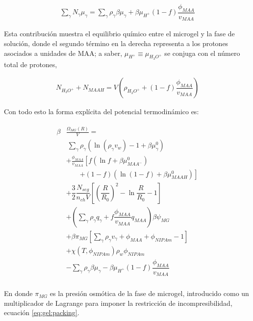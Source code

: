\begin{align}
	\sum_\gamma N_\gamma \mu_\gamma = \sum_{\gamma }{\rho_\gamma\beta\mu_\gamma}
	+ \beta\mu_{H^+}(1-f)\dfrac{\phi_{MAA}}{v_{MAA}}
\end{align}

Esta contribuci\'on muestra el equilibrio qu\'imico entre el microgel y la fase de soluci\'on, donde el segundo t\'ermino en la derecha representa a los protones asociados a unidades de MAA;
a saber, $\mu_{H^+}\equiv\mu_{H_3O^+}$ se conjuga con el n\'umero total de protones,

\begin{align}
	N_{H_3O^+}+N_{MAAH}=V\left(\rho_{H_3O^+}+(1-f)\dfrac{\phi_{MAA}}{v_{MAA}}\right)
	\label{eq:gel:equilibrio}
\end{align}



Con todo esto la forma expl\'icita del potencial termodin\'amico es:




%
\begin{align}
\begin{aligned}
\beta&\frac{\Omega_{MG}(R)}{V}=\\& ~ \sum_{\gamma} \rho_\gamma\left(\ln\left(\rho_\gamma v_w\right) -1 + \beta\mu^0_\gamma\right) \\
& + \frac{\phi_{MAA}}{v_{MAA}} \left[f(\ln f+ \beta\mu^0_{MAA^-})\right.\\
&\qquad\left.+(1-f)(\ln (1-f)+\beta\mu^0_{MAAH})\right] \\
%
& + \dfrac{3}{2}\dfrac{N_{seg}}{n_{ch} V}\left[\left(\dfrac{R}{R_0}\right)^2 - \ln\dfrac{R}{R_0} -1\right] \\
%
& +  \left(\sum_{\gamma } {\rho_\gamma q_\gamma + f\dfrac{\phi_{MAA}}{v_{MAA}}q_{MAA}}\right)\beta\psi_{MG}\\
%
& +\beta\pi_{MG} \left[ \sum_{\gamma } \rho_\gamma v_\gamma  + \phi_{MAA} + \phi_{NIPAm} -1 \right] \\
%
& + \chi (T, \phi_{NIPAm})\rho_w \phi_{NIPAm} \\
%
& -\sum_{\gamma }{\rho_\gamma\beta\mu_\gamma}
 -\beta\mu_{H^+}(1-f)\dfrac{\phi_{MAA}}{v_{MAA}}\\
%
%
\end{aligned}
\label{eq:gel:free-energy}
\end{align}




\noindent En donde $\pi_{MG}$ es la presi\'on osm\'otica de la fase de microgel, introducido como un multiplicador de Lagrange para imponer la restricci\'on de incompresibilidad, ecuaci\'on \ref{eq:gel:packing}.



